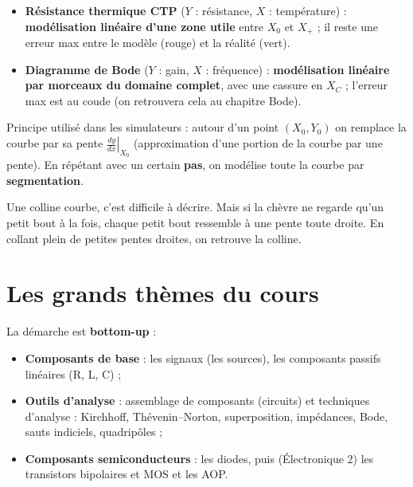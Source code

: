 \begin{exbox}[title=Deux exemples de linéarisation]
\begin{itemize}
  \item \textbf{Résistance thermique CTP} ($Y$ : résistance, $X$ : température) :
        \textbf{modélisation linéaire d'une zone \og utile\fg{}} entre $X_0$ et $X_+$ ; il
        reste une erreur max entre le modèle (rouge) et la réalité (vert).
  \item \textbf{Diagramme de Bode} ($Y$ : gain, $X$ : fréquence) : \textbf{modélisation
        linéaire par morceaux du domaine complet}, avec une cassure en $X_C$ ; l'erreur max
        est au coude (on retrouvera cela au chapitre Bode).
\end{itemize}
\end{exbox}


\begin{defnbox}[title=Approximation par calcul de tangentes]
Principe utilisé dans les simulateurs : autour d'un point $(X_0, Y_0)$ on remplace la
courbe par sa pente $\left.\frac{dy}{dx}\right|_{X_0}$ (approximation d'une portion de la
courbe par une pente). En répétant avec un certain \textbf{pas}, on modélise toute la
courbe par \textbf{segmentation}.
\end{defnbox}

\begin{goatbox}
Une colline courbe, c'est difficile à décrire. Mais si la chèvre ne regarde qu'un petit
bout à la fois, chaque petit bout ressemble à une pente toute droite. En collant plein de
petites pentes droites, on retrouve la colline.
\end{goatbox}

\section{Les grands thèmes du cours}


La démarche est \textbf{bottom-up} :
\begin{itemize}
  \item \textbf{Composants de base} : les signaux (les sources), les composants passifs
        linéaires (R, L, C) ;
  \item \textbf{Outils d'analyse} : assemblage de composants (circuits) et techniques
        d'analyse : Kirchhoff, Thévenin--Norton, superposition, impédances, Bode, sauts
        indiciels, quadripôles ;
  \item \textbf{Composants semiconducteurs} : les diodes, puis (Électronique 2) les
        transistors bipolaires et MOS et les AOP.
\end{itemize}

